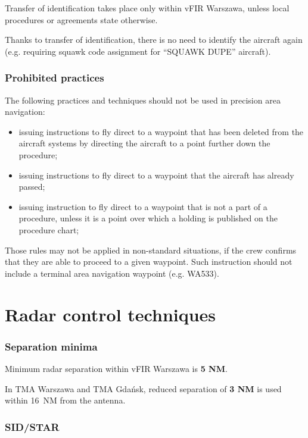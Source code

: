 Transfer of identification takes place only within vFIR Warszawa, unless local
procedures or agreements state otherwise.

Thanks to transfer of identification, there is no need to identify the aircraft
again (e.g. requiring squawk code assignment for ``SQUAWK DUPE'' aircraft).

\subsubsection{Prohibited practices}

The following practices and techniques should not be used in precision area
navigation:

\begin{itemize}
\item issuing instructions to fly direct to a waypoint that has been deleted
from the aircraft systems by directing the aircraft to a point further down the
procedure;
\item issuing instructions to fly direct to a waypoint that the aircraft has
already passed;
\item issuing instruction to fly direct to a waypoint that is not a part of a
procedure, unless it is a point over which a holding is published on the
procedure chart;
\end{itemize}

Those rules may not be applied in non-standard situations, if the crew confirms
that they are able to proceed to a given waypoint. Such instruction should not
include a terminal area navigation waypoint (e.g. WA533).

\section{Radar control techniques}

\subsubsection{Separation minima}

Minimum radar separation within vFIR Warszawa is \textbf{5 NM}.

In TMA Warszawa and TMA Gdańsk, reduced separation of \textbf{3 NM} is used
within 16~NM from the antenna.

\subsubsection{SID/STAR}

